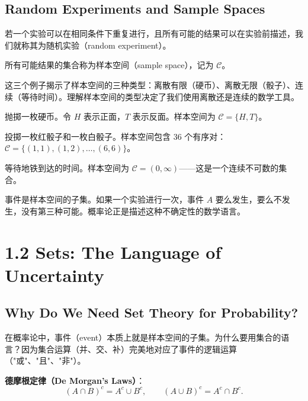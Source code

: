 \subsection{Random Experiments and Sample Spaces}

若一个实验可以在相同条件下重复进行，且所有可能的结果可以在实验前描述，我们就称其为随机实验（random experiment）。

所有可能结果的集合称为样本空间（sample space），记为 $\mathcal{C}$。

这三个例子揭示了样本空间的三种类型：离散有限（硬币）、离散无限（骰子）、连续（等待时间）。理解样本空间的类型决定了我们使用离散还是连续的数学工具。

\begin{example}\label{ex:coin-toss-ch1}
抛掷一枚硬币。令 $H$ 表示正面，$T$ 表示反面。样本空间为 $\mathcal{C} = \{H, T\}$。
\end{example}

\begin{example}\label{ex:two-dice-ch1}
投掷一枚红骰子和一枚白骰子。样本空间包含 36 个有序对：$\mathcal{C} = \{(1,1), (1,2), \ldots, (6,6)\}$。
\end{example}

\begin{example}\label{ex:waiting-time-ch1}
等待地铁到达的时间。样本空间为 $\mathcal{C} = (0, \infty)$——这是一个连续不可数的集合。
\end{example}

事件是样本空间的子集。如果一个实验进行一次，事件 $A$ 要么发生，要么不发生，没有第三种可能。概率论正是描述这种不确定性的数学语言。

\section{1.2 Sets: The Language of Uncertainty}\label{sec:1.2}

\subsection{Why Do We Need Set Theory for Probability?}

在概率论中，事件（event）本质上就是样本空间的子集。为什么要用集合的语言？因为集合运算（并、交、补）完美地对应了事件的逻辑运算（"或"、"且"、"非"）。

\textbf{德摩根定律（De Morgan's Laws）}：
\[
(A \cap B)^c = A^c \cup B^c, \qquad (A \cup B)^c = A^c \cap B^c.
\tag{1.2.1}\label{eq:de-morgan}
\]

